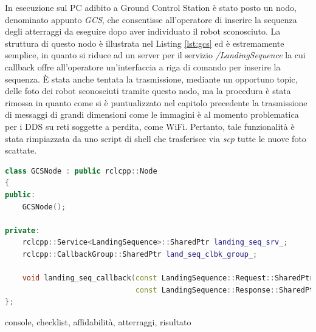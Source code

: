 \indent In esecuzione sul PC adibito a Ground Control Station è stato posto un nodo, denominato appunto \emph{GCS}, che consentisse all'operatore di inserire la sequenza degli atterraggi da eseguire dopo aver individuato il robot sconosciuto. La struttura di questo nodo è illustrata nel Listing \ref{lst:gcs} ed è estremamente semplice, in quanto si riduce ad un server per il servizio \emph{/LandingSequence} la cui callback offre all'operatore un'interfaccia a riga di comando per inserire la sequenza. È stata anche tentata la trasmissione, mediante un opportuno topic, delle foto dei robot sconosciuti tramite questo nodo, ma la procedura è stata rimossa in quanto come si è puntualizzato nel capitolo precedente la trasmissione di messaggi di grandi dimensioni come le immagini è al momento problematica per i DDS su reti soggette a perdita, come WiFi. Pertanto, tale funzionalità è stata rimpiazzata da uno script di shell che trasferisce via \emph{scp} tutte le nuove foto scattate.
\vspace{1cm}
\begin{lstlisting}[language=C++, caption={Definizione del nodo \emph{gcs}.}, label={lst:gcs}]
class GCSNode : public rclcpp::Node
{
public:
    GCSNode();

private:
    rclcpp::Service<LandingSequence>::SharedPtr landing_seq_srv_;
    rclcpp::CallbackGroup::SharedPtr land_seq_clbk_group_;

    void landing_seq_callback(const LandingSequence::Request::SharedPtr request,
                              const LandingSequence::Response::SharedPtr response);
};
\end{lstlisting}

console, checklist, affidabilità, atterraggi, risultato
\indent
